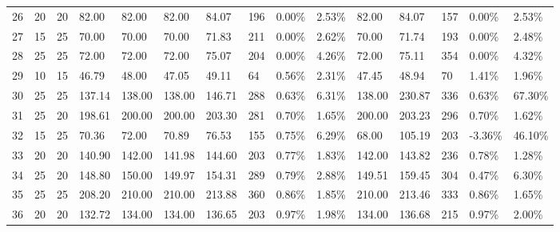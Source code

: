 \documentclass[
  a4paper,
,tablecaptionabove
]{scrartcl}
\begin{document}
\begin{longtable}{l|ll|ll|lllll|lllll}
  26 & 20                         & 20                         & 82.00                     & 82.00       & 82.00         & 84.07  & 196 & 0.00\%  & 2.53\% & 82.00  & 84.07  & 157 & 0.00\%  & 2.53\%  \\
  27 & 15                         & 25                         & 70.00                     & 70.00       & 70.00         & 71.83  & 211 & 0.00\%  & 2.62\% & 70.00  & 71.74  & 193 & 0.00\%  & 2.48\%  \\
  28 & 25                         & 25                         & 72.00                     & 72.00       & 72.00         & 75.07  & 204 & 0.00\%  & 4.26\% & 72.00  & 75.11  & 354 & 0.00\%  & 4.32\%  \\
  29 & 10                         & 15                         & 46.79                     & 48.00       & 47.05         & 49.11  & 64  & 0.56\%  & 2.31\% & 47.45  & 48.94  & 70  & 1.41\%  & 1.96\%  \\
  30 & 25                         & 25                         & 137.14                    & 138.00      & 138.00        & 146.71 & 288 & 0.63\%  & 6.31\% & 138.00 & 230.87 & 336 & 0.63\%  & 67.30\% \\
  31 & 25                         & 20                         & 198.61                    & 200.00      & 200.00        & 203.30 & 281 & 0.70\%  & 1.65\% & 200.00 & 203.23 & 296 & 0.70\%  & 1.62\%  \\
  32 & 15                         & 25                         & 70.36                     & 72.00       & 70.89         & 76.53  & 155 & 0.75\%  & 6.29\% & 68.00  & 105.19 & 203 & -3.36\% & 46.10\% \\
  33 & 20                         & 20                         & 140.90                    & 142.00      & 141.98        & 144.60 & 203 & 0.77\%  & 1.83\% & 142.00 & 143.82 & 236 & 0.78\%  & 1.28\%  \\
  34 & 25                         & 20                         & 148.80                    & 150.00      & 149.97        & 154.31 & 289 & 0.79\%  & 2.88\% & 149.51 & 159.45 & 304 & 0.47\%  & 6.30\%  \\
  35 & 25                         & 25                         & 208.20                    & 210.00      & 210.00        & 213.88 & 360 & 0.86\%  & 1.85\% & 210.00 & 213.46 & 333 & 0.86\%  & 1.65\%  \\
  36 & 20                         & 20                         & 132.72                    & 134.00      & 134.00        & 136.65 & 203 & 0.97\%  & 1.98\% & 134.00 & 136.68 & 215 & 0.97\%  & 2.00\%  \\

\end{longtable}
\end{document}
